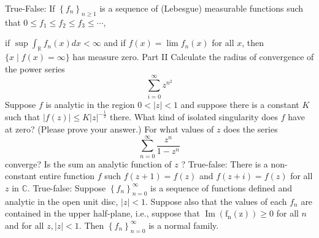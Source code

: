 \documentclass[14pt]{extarticle}
\begin{document}
True-False: If $\left\{f_{n}\right\}_{n \geq 1}$ is a sequence of (Lebesgue) measurable functions such that $0 \leq f_{1} \leq f_{2} \leq f_{3} \leq \cdots$,

if $\sup \int_{\mathbb{R}} f_{n}(x) d x<\infty$ and if $f(x)=\lim f_{n}(x)$ for all $x$, then $\{x \mid f(x)=\infty\}$ has measure zero. Part II
\newpage
Calculate the radius of convergence of the power series
\[\sum_{i=0}^\infty z^{n^2}\]
\newpage
Suppose $f$ is analytic in the region $0<|z|<1$ and suppose there is a constant $K$ such that $|f(z)| \leq K|z|^{-\frac{1}{2}}$
there. What kind of isolated singularity does $f$ have at zero? (Please prove your answer.)
\newpage
For what values of $z$ does the series
$$
\sum_{n=0}^{\infty} \frac{z^{n}}{1-z^{n}}
$$
converge? Is the sum an analytic function of $z$ ?
\newpage
True-false: There is a non-constant entire function $f$ such $f(z+1)=f(z)$ and $f(z+i)=f(z)$ for all $z$ in $\mathbb{C}$.
\newpage
True-false: Suppose $\left\{f_{n}\right\}_{n=0}^{\infty}$ is a sequence of functions defined and analytic in the open unit disc, $|z|<1$. Suppose also that the values of each $f_{n}$ are contained in the upper half-plane, i.e., suppose that $\operatorname{Im}\left(\mathrm{f}_{\mathrm{n}}(\mathrm{z})\right) \geq 0$ for all $n$ and for all $z,|z|<1$. Then $\left\{f_{n}\right\}_{n=0}^{\infty}$ is a normal family.
\newpage
\end{document}
